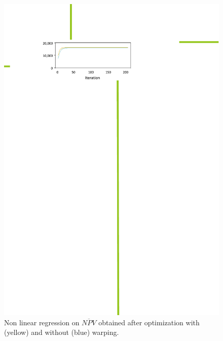 \begin{figure}[!ht]
	\centering
	\includegraphics[trim = 4cm 15cm 4cm 3cm, clip]{Figures_Warping_resultats_courbes_regression_lineaire_warping_sanswarping.pdf}
	\caption{Non linear regression on $\overline{NPV}$ obtained after optimization with (yellow) and without (blue) warping.}\label{fig:nonlinear_regression}
\end{figure}

